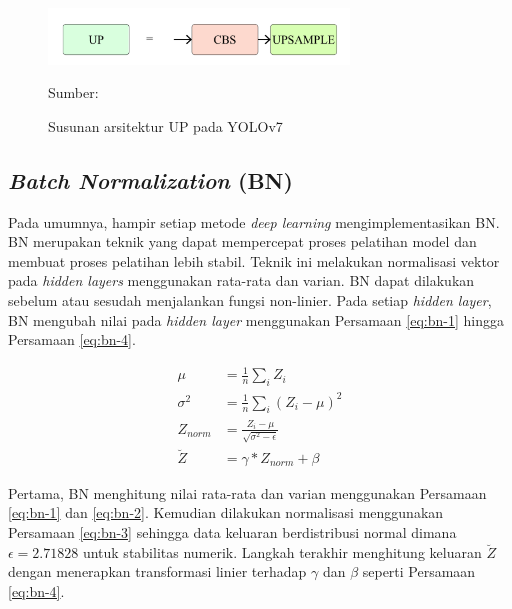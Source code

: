     \begin{figure}[H]
        \begin{center}
            \includegraphics[width=8cm]{img/bab2/up.png}
            \caption{Susunan arsitektur UP pada YOLOv7}
            \label{fig:up}
            Sumber: \citep{Wang2022}
        \end{center}
    \end{figure}    

    \subsection{\textit{Batch Normalization} (BN)}
    Pada umumnya, hampir setiap metode \textit{deep learning} mengimplementasikan BN. BN merupakan teknik yang dapat mempercepat proses pelatihan model dan membuat proses pelatihan lebih stabil. Teknik ini melakukan normalisasi vektor pada \textit{hidden layers} menggunakan rata-rata dan varian. BN dapat dilakukan sebelum atau sesudah menjalankan fungsi non-linier. Pada setiap \textit{hidden layer}, BN mengubah nilai pada \textit{hidden layer} menggunakan Persamaan \ref{eq:bn-1} hingga Persamaan \ref{eq:bn-4}.

    \begin{align}
        \label{eq:bn-1}
        \mu &= \frac{1}{n} \sum_i Z_{i}\\
        \label{eq:bn-2}
        \sigma^2 &= \frac{1}{n} \sum_i (Z_{i}-\mu)^2\\
        \label{eq:bn-3}
        Z_{norm} &= \frac{Z_{i}-\mu}{\sqrt{\sigma^2-\epsilon}}\\
        \label{eq:bn-4}
        \breve{Z} &= \gamma \ast Z_{norm}+\beta
    \end{align}

    Pertama, BN menghitung nilai rata-rata dan varian menggunakan Persamaan \ref{eq:bn-1} dan \ref{eq:bn-2}. Kemudian dilakukan normalisasi menggunakan Persamaan \ref{eq:bn-3} sehingga data keluaran berdistribusi normal dimana $\epsilon = 2.71828$ untuk stabilitas numerik. Langkah terakhir menghitung keluaran $\breve{Z}$ dengan menerapkan transformasi linier terhadap $\gamma$ dan $\beta$ seperti Persamaan \ref{eq:bn-4}.

